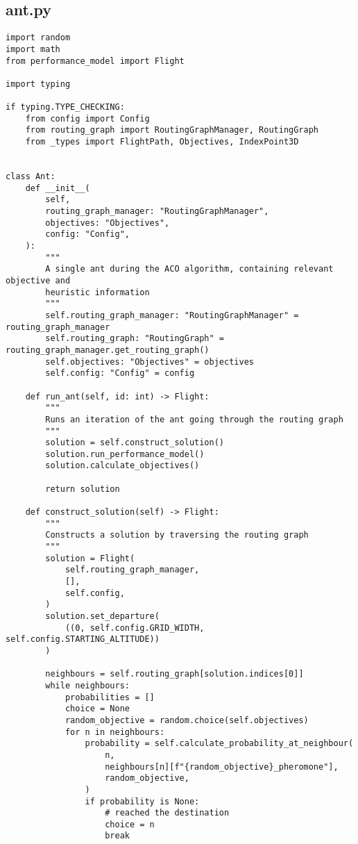 \subsection{ant.py}
\begin{verbatim}
import random
import math
from performance_model import Flight

import typing

if typing.TYPE_CHECKING:
    from config import Config
    from routing_graph import RoutingGraphManager, RoutingGraph
    from _types import FlightPath, Objectives, IndexPoint3D


class Ant:
    def __init__(
        self,
        routing_graph_manager: "RoutingGraphManager",
        objectives: "Objectives",
        config: "Config",
    ):
        """
        A single ant during the ACO algorithm, containing relevant objective and
        heuristic information
        """
        self.routing_graph_manager: "RoutingGraphManager" = routing_graph_manager
        self.routing_graph: "RoutingGraph" = routing_graph_manager.get_routing_graph()
        self.objectives: "Objectives" = objectives
        self.config: "Config" = config

    def run_ant(self, id: int) -> Flight:
        """
        Runs an iteration of the ant going through the routing graph
        """
        solution = self.construct_solution()
        solution.run_performance_model()
        solution.calculate_objectives()

        return solution

    def construct_solution(self) -> Flight:
        """
        Constructs a solution by traversing the routing graph
        """
        solution = Flight(
            self.routing_graph_manager,
            [],
            self.config,
        )
        solution.set_departure(
            ((0, self.config.GRID_WIDTH, self.config.STARTING_ALTITUDE))
        )

        neighbours = self.routing_graph[solution.indices[0]]
        while neighbours:
            probabilities = []
            choice = None
            random_objective = random.choice(self.objectives)
            for n in neighbours:
                probability = self.calculate_probability_at_neighbour(
                    n,
                    neighbours[n][f"{random_objective}_pheromone"],
                    random_objective,
                )
                if probability is None:
                    # reached the destination
                    choice = n
                    break


\end{verbatim}
